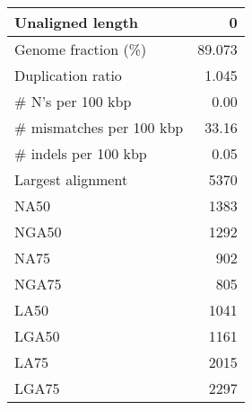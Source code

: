 \documentclass[12pt,a4paper]{article}
\begin{document}
\begin{table}[ht]
\begin{center}
\begin{tabular}{|l*{1}{|r}|}
Unaligned length & 0 \\ \hline
Genome fraction (\%) & 89.073 \\ \hline
Duplication ratio & 1.045 \\ \hline
\# N's per 100 kbp & 0.00 \\ \hline
\# mismatches per 100 kbp & 33.16 \\ \hline
\# indels per 100 kbp & 0.05 \\ \hline
Largest alignment & 5370 \\ \hline
NA50 & 1383 \\ \hline
NGA50 & 1292 \\ \hline
NA75 & 902 \\ \hline
NGA75 & 805 \\ \hline
LA50 & 1041 \\ \hline
LGA50 & 1161 \\ \hline
LA75 & 2015 \\ \hline
LGA75 & 2297 \\ \hline
\end{tabular}
\end{center}
\end{table}
\end{document}
